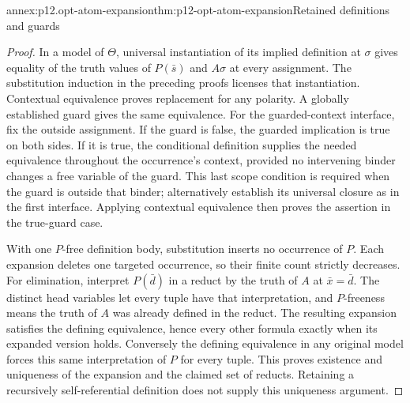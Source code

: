 \begin{annexitem}{annex:p12.opt-atom-expansion}{thm:p12-opt-atom-expansion}{Retained definitions and guards}
\begin{proof}
In a model of \(\Theta\), universal instantiation of its implied
definition at \(\sigma\) gives equality of the truth values of
\(P(\bar s)\) and \(A\sigma\) at every assignment.
The substitution induction in the preceding proofs licenses that
instantiation. Contextual equivalence proves replacement for any
polarity. A globally established guard gives the same equivalence.
For the guarded-context interface, fix the outside assignment.
If the guard is false, the guarded implication is true on both
sides. If it is true, the conditional definition supplies the
needed equivalence throughout the occurrence's context, provided
no intervening binder changes a free variable of the guard.
This last scope condition is required when the guard is outside
that binder; alternatively establish its universal closure as in
the first interface. Applying contextual equivalence then proves
the assertion in the true-guard case.

With one \(P\)-free definition body, substitution inserts no
occurrence of \(P\). Each expansion deletes one targeted occurrence,
so their finite count strictly decreases.
For elimination, interpret \(P(\bar d)\) in a reduct by the truth
of \(A\) at \(\bar x=\bar d\). The distinct head variables let
every tuple have that interpretation, and \(P\)-freeness means the
truth of \(A\) was already defined in the reduct. The resulting
expansion satisfies the defining equivalence, hence every other
formula exactly when its expanded version holds.
Conversely the defining equivalence in any original model forces
this same interpretation of \(P\) for every tuple. This proves
existence and uniqueness of the expansion and the claimed set of
reducts. Retaining a recursively self-referential definition does
not supply this uniqueness argument.
\end{proof}
\end{annexitem}

